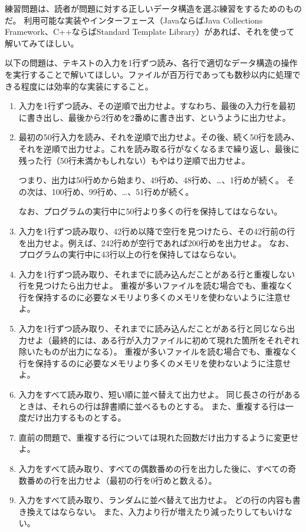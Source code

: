 \begin{exc}
練習問題は、読者が問題に対する正しいデータ構造を選ぶ練習をするためのものだ。
利用可能な実装やインターフェース（JavaならばJava Collections Framework、C++ならばStandard Template Library）があれば、それを使って解いてみてほしい。

以下の問題は、テキストの入力を1行ずつ読み、各行で適切なデータ構造の操作を実行することで解いてほしい。ファイルが百万行であっても数秒以内に処理できる程度には効率的な実装にすること。

  \begin{enumerate}
    \item 入力を1行ずつ読み、その逆順で出力せよ。すなわち、最後の入力行を最初に書き出し、最後から2行めを2番めに書き出す、というように出力せよ。

    \item  最初の50行入力を読み、それを逆順で出力せよ。その後、続く50行を読み、それを逆順で出力せよ。これを読み取る行がなくなるまで繰り返し、最後に残った行（50行未満かもしれない）もやはり逆順で出力せよ。

      つまり、出力は50行めから始まり、49行め、48行め、…、1行めが続く。
	  その次は、100行め、99行め、…、51行めが続く。

	 なお、プログラムの実行中に50行より多くの行を保持してはならない。

    \item 入力を1行ずつ読み取り、42行め以降で空行を見つけたら、その42行前の行を出力せよ。例えば、242行めが空行であれば200行めを出力せよ。
	なお、プログラムの実行中に43行以上の行を保持してはならない。

    \item 入力を1行ずつ読み取り、それまでに読み込んだことがある行と重複しない行を見つけたら出力せよ。
	重複が多いファイルを読む場合でも、重複なく行を保持するのに必要なメモリより多くのメモリを使わないように注意せよ。

    \item 入力を1行ずつ読み取り、それまでに読み込んだことがある行と同じなら出力せよ（最終的には、ある行が入力ファイルに初めて現れた箇所をそれぞれ除いたものが出力になる）。
	重複が多いファイルを読む場合でも、重複なく行を保持するのに必要なメモリより多くのメモリを使わないように注意せよ。

    \item 入力をすべて読み取り、短い順に並べ替えて出力せよ。
	同じ長さの行があるときは、それらの行は辞書順に並べるものとする。
	また、重複する行は一度だけ出力するものとする。

    \item 直前の問題で、重複する行については現れた回数だけ出力するように変更せよ。

    \item 入力をすべて読み取り、すべての偶数番めの行を出力した後に、すべての奇数番めの行を出力せよ（最初の行を0行めと数える）。

    \item 入力をすべて読み取り、ランダムに並べ替えて出力せよ。
	どの行の内容も書き換えてはならない。
	また、入力より行が増えたり減ったりしてもいけない。
  \end{enumerate}
\end{exc}


